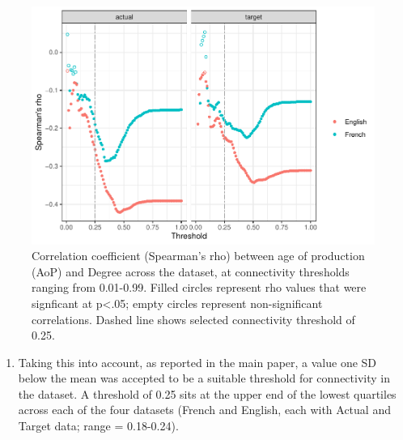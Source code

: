 \documentclass[
  man,floatsintext]{apa6}
\providecommand{\tightlist}{%
  \setlength{\itemsep}{0pt}\setlength{\parskip}{0pt}}
\begin{document}
\begin{figure}
\centering
\includegraphics{PhonNetworksSupplementaryData-test_files/figure-latex/aop-degree-correlation-1.pdf}
\caption{\label{fig:aop-degree-correlation}Correlation coefficient (Spearman's rho) between age of production (AoP) and Degree across the dataset, at connectivity thresholds ranging from 0.01-0.99. Filled circles represent rho values that were signficant at p\textless.05; empty circles represent non-significant correlations. Dashed line shows selected connectivity threshold of 0.25.}
\end{figure}

\begin{enumerate}
\def\labelenumi{\arabic{enumi})}
\setcounter{enumi}{1}
\tightlist
\item
  Taking this into account, as reported in the main paper, a value one SD below the mean was accepted to be a suitable threshold for connectivity in the dataset. A threshold of 0.25 sits at the upper end of the lowest quartiles across each of the four datasets (French and English, each with Actual and Target data; range = 0.18-0.24).
\end{enumerate}
\end{document}
